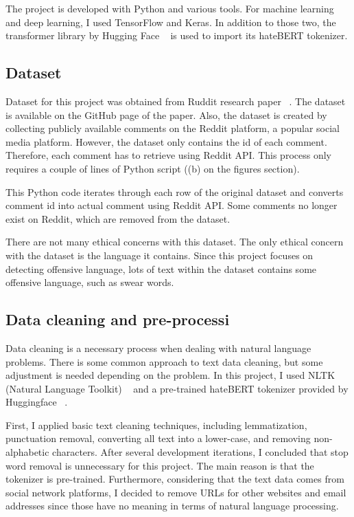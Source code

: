 \documentclass[11pt, natbib=false]{article}
\begin{document}
The project is developed with Python and various tools.
For machine learning and deep learning, I used TensorFlow and Keras.
In addition to those two, the transformer library by Hugging Face ~\cite{huggingface} is used to import its hateBERT tokenizer.

\subsection{Dataset}
Dataset for this project was obtained from Ruddit research paper ~\cite{hada2021ruddit}.
The dataset is available on the GitHub page of the paper.
Also, the dataset is created by collecting publicly available comments on the Reddit platform, a popular social media platform.
However, the dataset only contains the id of each comment.
Therefore, each comment has to retrieve using Reddit API.
This process only requires a couple of lines of Python script ((b) on the figures section).

This Python code iterates through each row of the original dataset and converts comment id into actual comment using Reddit API.
Some comments no longer exist on Reddit, which are removed from the dataset.

There are not many ethical concerns with this dataset.
The only ethical concern with the dataset is the language it contains.
Since this project focuses on detecting offensive language, lots of text within the dataset contains some offensive language, such as swear words.


\subsection{Data cleaning and pre-processi}
Data cleaning is a necessary process when dealing with natural language problems.
There is some common approach to text data cleaning, but some adjustment is needed depending on the problem.
In this project, I used NLTK (Natural Language Toolkit) ~\cite{nltk} and a pre-trained hateBERT tokenizer provided by Huggingface ~\cite{huggingface}.

First, I applied basic text cleaning techniques, including lemmatization, punctuation removal, converting all text into a lower-case, and removing non-alphabetic characters.
After several development iterations, I concluded that stop word removal is unnecessary for this project.
The main reason is that the tokenizer is pre-trained.
Furthermore, considering that the text data comes from social network platforms, I decided to remove URLs for other websites and email addresses since those have no meaning in terms of natural language processing.
\end{document}
